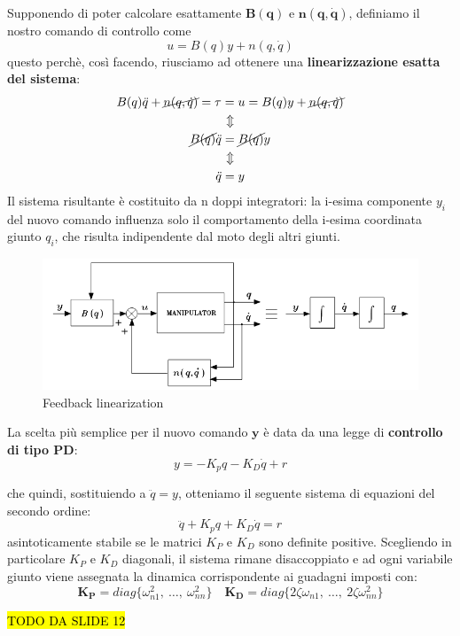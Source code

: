 Supponendo di poter calcolare esattamente $\mathbf{B(q)}$ e $\mathbf{n(q, \dot{q})}$, definiamo il nostro comando di controllo come
\boldmath
$$
u = B(q)y + n(q, \dot{q})
$$
questo perchè, così facendo, riusciamo ad ottenere una \textbf{linearizzazione esatta del sistema}:
\begin{gather*}
B(q)\ddot{q} + \cancel{n(q, \dot{q})} = \tau = u = B(q)y + \cancel{n(q, \dot{q})} \\
\Updownarrow \\
\cancel{B(q)}\ddot{q} = \cancel{B(q)}y \\
\Updownarrow \\
\ddot{q} = y
\end{gather*}
Il sistema risultante è costituito da n doppi integratori: la i-esima componente $y_i$ del nuovo comando influenza solo il comportamento della i-esima coordinata giunto $q_i$, che risulta indipendente dal moto degli altri giunti.


\begin{figure}[H]
	\centering
	\includegraphics[width=0.8\linewidth]{images/centralized_control_1}
	\caption{Feedback linearization}
	\label{fig:centralizedcontrol1}
\end{figure}

La scelta più semplice per il nuovo comando $\mathbf{y}$ è data da una legge di \textbf{controllo di tipo PD}:
$$
y = -K_p q - K_D \dot{q} + r
$$

che quindi, sostituiendo a $\ddot{q} = y$, otteniamo il seguente sistema di equazioni del secondo ordine:
$$
\ddot{q} + K_p q + K_D \dot{q} = r
$$
asintoticamente stabile se le matrici $K_P$ e $K_D$ sono definite positive.
Scegliendo in particolare $K_P$ e $K_D$ diagonali, il sistema rimane disaccoppiato e ad ogni variabile giunto viene assegnata la dinamica corrispondente ai guadagni imposti con:
\unboldmath
$$
\mathbf{K_P} = diag\{\omega_{n1}^2, \ \dots, \ \omega_{nn}^2\}
\quad
\mathbf{K_D} = diag\{2\zeta\omega_{n1}, \ \dots, \ 2\zeta\omega_{nn}^2\}
$$



\hl{TODO DA SLIDE 12}


